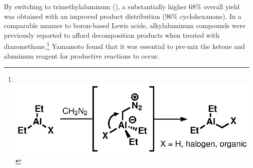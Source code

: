 By switching to trimethylaluminum (), a substantially higher 68\% overall
yield was obtained with an improved product distribution (96\% cyclohexanone).
In a comparable manner to boron-based Lewis acids, alkylaluminum compounds were previously reported
to afford decomposition products when treated with diazomethane.\footnote{\\
\includegraphics[scale=0.7]{chp_diazobkg/images/hoberg}} Yamamoto found that it was essential to
pre-mix the ketone and aluminum reagent for productive reactions to
occur.  




